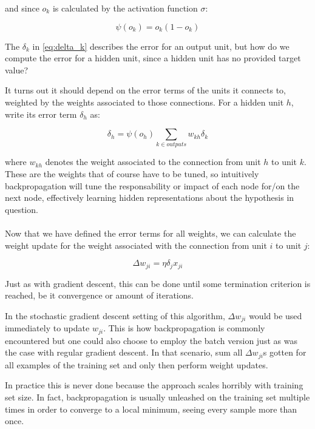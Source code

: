 and since $o_k$ is calculated by the activation function $\sigma$:

\begin{equation}
  \psi(o_k) = o_k (1 - o_k)
\end{equation}

The $\delta_k$ in \ref{eq:delta_k}
describes the error for an output unit,
but how do we compute the error for a hidden unit,
since a hidden unit has no provided target value?

It turns out it should depend on the error terms
of the units it connects to,
weighted by the weights associated to those connections.
For a hidden unit $h$, write its error term $\delta_h$ as:

\begin{equation}
  \delta_h = \psi(o_h) \sum_{k \in outputs} w_{kh}\delta_k
\end{equation}

where $w_{kh}$ denotes the weight associated to
the connection from unit $h$ to unit $k$.
These are the weights that of course have to be tuned,
so intuitively backpropagation will tune
the responsability or impact of each node for/on the next node,
effectively learning hidden representations about the hypothesis in question.

\paragraph{}
Now that we have defined the error terms for all weights,
we can calculate the weight update
for the weight associated with the connection
from unit $i$ to unit $j$:

\begin{equation}
  \Delta w_{ji} = \eta \delta_j x_{ji}
\end{equation}

Just as with gradient descent,
this can be done until some termination criterion is reached,
be it convergence or amount of iterations.

In the stochastic gradient descent setting of this algorithm,
$\Delta w_{ji}$ would be used immediately to update
$w_{ji}$.
This is how backpropagation is commonly encountered
but one could also choose to employ the batch version
just as was the case with regular gradient descent.
In that scenario,
sum all $\Delta w_{ji}$s
gotten for all examples of the training set
and only then perform weight updates.

In practice this is never done because the approach scales horribly
with training set size.
In fact, backpropagation is usually unleashed on the training set multiple times
in order to converge to a local minimum,
seeing every sample more than once.

